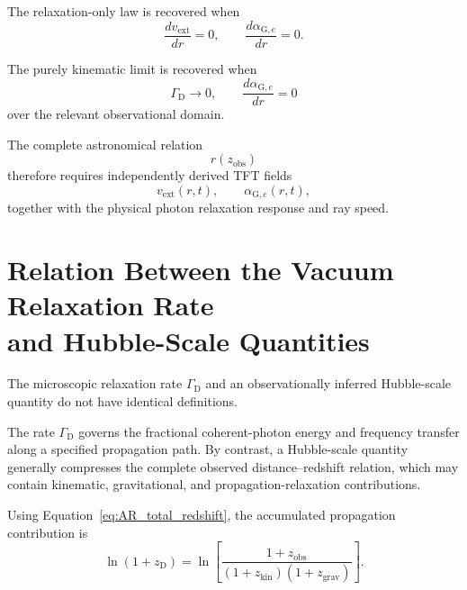 The relaxation-only law is recovered when
\begin{equation}
    \frac{
        dv_{\mathrm{ext}}
    }{
        dr
    }
    =
    0,
    \qquad
    \frac{
        d\alpha_{\mathrm G,e}
    }{
        dr
    }
    =
    0.
\end{equation}

The purely kinematic limit is recovered when
\begin{equation}
    \Gamma_{\mathrm D}
    \rightarrow
    0,
    \qquad
    \frac{
        d\alpha_{\mathrm G,e}
    }{
        dr
    }
    =
    0
\end{equation}
over the relevant observational domain.

The complete astronomical relation
\begin{equation}
    r(z_{\mathrm{obs}})
\end{equation}
therefore requires independently derived TFT fields
\begin{equation}
    v_{\mathrm{ext}}(r,t),
    \qquad
    \alpha_{\mathrm G,e}(r,t),
\end{equation}
together with the physical photon relaxation response and ray speed.

\section[Relation Between the Vacuum Relaxation Rate and Hubble-Scale Quantities]
{Relation Between the Vacuum Relaxation Rate\texorpdfstring{\\}{ }and Hubble-Scale Quantities}
\label{sec:AS_gamma_hubble_relation}

The microscopic relaxation rate
\(\Gamma_{\mathrm D}\)
and an observationally inferred Hubble-scale quantity do not have identical
definitions.

The rate
\(\Gamma_{\mathrm D}\)
governs the fractional coherent-photon energy and frequency transfer along a
specified propagation path. By contrast, a Hubble-scale quantity generally
compresses the complete observed distance--redshift relation, which may contain
kinematic, gravitational, and propagation-relaxation contributions.

Using Equation~\eqref{eq:AR_total_redshift}, the accumulated propagation
contribution is
\begin{equation}
    \ln(1+z_{\mathrm D})
    =
    \ln
    \left[
        \frac{
            1+z_{\mathrm{obs}}
        }{
            (1+z_{\mathrm{kin}})
            (1+z_{\mathrm{grav}})
        }
    \right].
    \label{eq:AS_relaxation_residual}
\end{equation}

